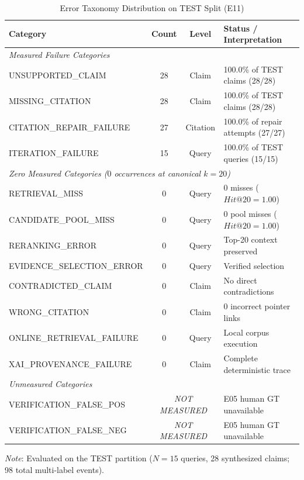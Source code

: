 \begin{table}[t]
\caption{Error Taxonomy Distribution on TEST Split (E11)}
\label{tab:error_taxonomy}
\centering
\small
\begin{tabular}{lccl}
\toprule
\textbf{Category} & \textbf{Count} & \textbf{Level} & \textbf{Status / Interpretation} \\
\midrule
\multicolumn{4}{l}{\textit{Measured Failure Categories}} \\
UNSUPPORTED\_CLAIM          & 28 & Claim    & 100.0\% of TEST claims (28/28) \\
MISSING\_CITATION           & 28 & Claim    & 100.0\% of TEST claims (28/28) \\
CITATION\_REPAIR\_FAILURE   & 27 & Citation & 100.0\% of repair attempts (27/27) \\
ITERATION\_FAILURE          & 15 & Query    & 100.0\% of TEST queries (15/15) \\
\midrule
\multicolumn{4}{l}{\textit{Zero Measured Categories ($0$ occurrences at canonical $k=20$)}} \\
RETRIEVAL\_MISS             & 0  & Query    & 0 misses ($Hit@20=1.00$) \\
CANDIDATE\_POOL\_MISS       & 0  & Query    & 0 pool misses ($Hit@20=1.00$) \\
RERANKING\_ERROR            & 0  & Query    & Top-20 context preserved \\
EVIDENCE\_SELECTION\_ERROR  & 0  & Query    & Verified selection \\
CONTRADICTED\_CLAIM         & 0  & Claim    & No direct contradictions \\
WRONG\_CITATION             & 0  & Claim    & 0 incorrect pointer links \\
ONLINE\_RETRIEVAL\_FAILURE  & 0  & Query    & Local corpus execution \\
XAI\_PROVENANCE\_FAILURE    & 0  & Claim    & Complete deterministic trace \\
\midrule
\multicolumn{4}{l}{\textit{Unmeasured Categories}} \\
VERIFICATION\_FALSE\_POS    & \multicolumn{2}{c}{\textit{NOT MEASURED}} & E05 human GT unavailable \\
VERIFICATION\_FALSE\_NEG    & \multicolumn{2}{c}{\textit{NOT MEASURED}} & E05 human GT unavailable \\
\bottomrule
\end{tabular}
\vspace{1ex}
\begin{minipage}{\columnwidth}
\footnotesize
\textit{Note}: Evaluated on the TEST partition ($N=15$ queries, 28 synthesized claims; 98 total multi-label events).
\end{minipage}
\end{table}
